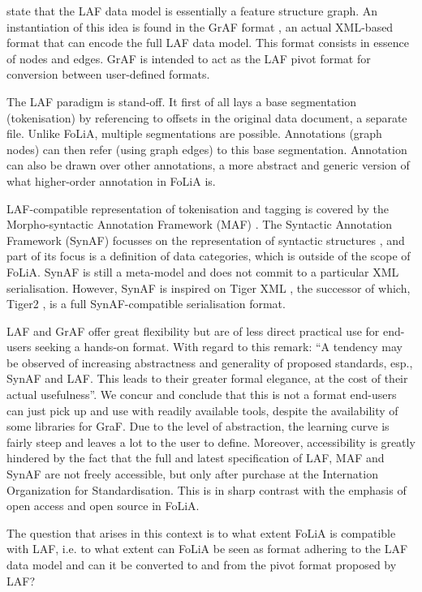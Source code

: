 \documentclass[a4paper,10pt,twoside]{article}
\begin{document}
 state that the LAF data model is essentially a feature structure
graph. An instantiation of this idea is found in the GrAF format \cite{GRAF},
an actual XML-based format that can encode the full LAF data model. This format
 consists in essence of nodes and edges. GrAF is intended to act as the LAF pivot format
for conversion between user-defined formats. 

The LAF paradigm is stand-off. It first of all lays a base segmentation
(tokenisation) by referencing to offsets in the original data document, a
separate file. Unlike FoLiA, multiple segmentations are possible. Annotations
(graph nodes) can then refer (using graph edges) to this base segmentation.
Annotation can also be drawn over other annotations, a more abstract and
generic version of what higher-order annotation in FoLiA is.

LAF-compatible representation of tokenisation and tagging is covered by the
Morpho-syntactic Annotation Framework (MAF) \cite{MAF}. The Syntactic Annotation
Framework (SynAF) focusses on the representation of syntactic structures
\cite{SYNAF}, and part of its focus is a definition of data categories, which
is outside of the scope of FoLiA. SynAF is still a meta-model and does not commit to a particular
XML serialisation. However, SynAF is inspired on Tiger XML \cite{TIGER}, the successor
of which, Tiger2 \cite{TIGER2}, is a full SynAF-compatible serialisation
format.

LAF and GrAF offer great flexibility but are of less direct practical use for
end-users seeking a hands-on format. With regard to this
 remark: ``A tendency may be observed of increasing
abstractness and generality of proposed standards, esp., SynAF and LAF. This
leads to their greater formal elegance, at the cost of their actual
usefulness''. We concur and conclude that this is not a format end-users can
just pick up and use with readily available tools, despite the availability of
some libraries for GraF. Due to the level of abstraction, the learning curve is
fairly steep and leaves a lot to the user to define. Moreover, accessibility is
greatly hindered by the fact that the full and latest specification of LAF, MAF
and SynAF are not freely accessible, but only after purchase at the Internation
Organization for Standardisation.  This is in sharp contrast with the emphasis
of open access and open source in FoLiA. 

The question that arises in this context is to what extent FoLiA is compatible
with LAF, i.e. to what extent can FoLiA be seen as format adhering to the LAF
data model and can it be converted to and from the pivot format proposed by LAF?
\end{document}
